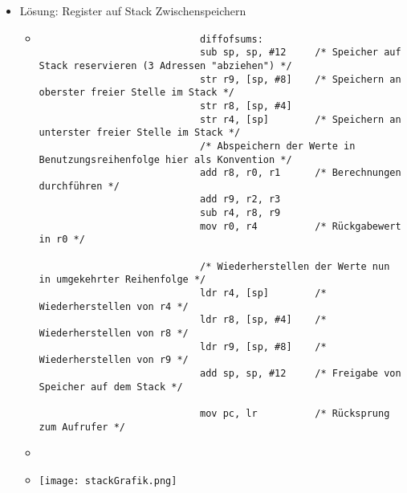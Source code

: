 \begin{itemize}
\begin{itemize}
                \item Lösung: Register auf Stack Zwischenspeichern
                    \begin{itemize}
                        \item[]
                            \begin{verbatim}
                            diffofsums:
                            sub sp, sp, #12     /* Speicher auf Stack reservieren (3 Adressen "abziehen") */
                            str r9, [sp, #8]    /* Speichern an oberster freier Stelle im Stack */
                            str r8, [sp, #4]
                            str r4, [sp]        /* Speichern an unterster freier Stelle im Stack */
                            /* Abspeichern der Werte in Benutzungsreihenfolge hier als Konvention */
                            add r8, r0, r1      /* Berechnungen durchführen */
                            add r9, r2, r3
                            sub r4, r8, r9
                            mov r0, r4          /* Rückgabewert in r0 */

                            /* Wiederherstellen der Werte nun in umgekehrter Reihenfolge */
                            ldr r4, [sp]        /* Wiederherstellen von r4 */
                            ldr r8, [sp, #4]    /* Wiederherstellen von r8 */
                            ldr r9, [sp, #8]    /* Wiederherstellen von r9 */
                            add sp, sp, #12     /* Freigabe von Speicher auf dem Stack */

                            mov pc, lr          /* Rücksprung zum Aufrufer */
                            \end{verbatim}
                        \item[]
                        \item[] \texttt{[image: stackGrafik.png]}
                    \end{itemize}


\end{itemize}
\end{itemize}
